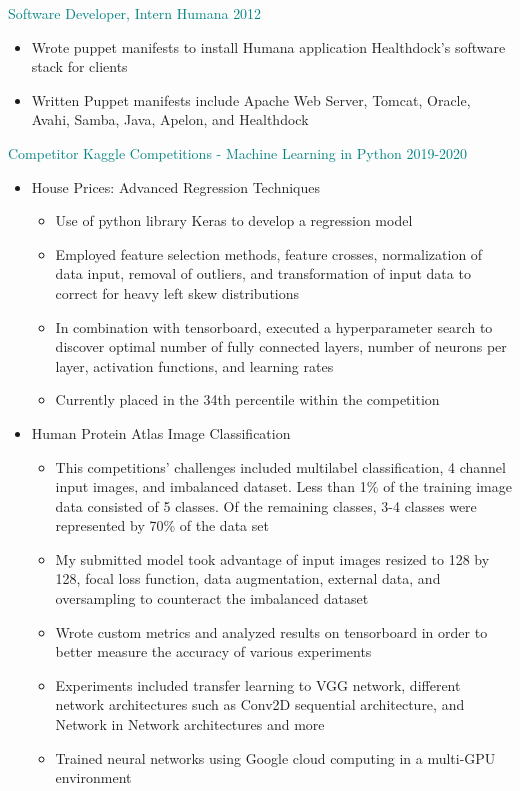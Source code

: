 \documentclass[11pt]{ltxdoc}
\begin{document}
	\textcolor{teal}{Software Developer, Intern} \hfill \textcolor{teal}{Humana} \hfill \textcolor{teal}{2012}
		
		\begin{itemize}
			\item Wrote puppet manifests to install Humana application Healthdock's software stack for clients
			\item Written Puppet manifests include Apache Web Server, Tomcat, Oracle, Avahi, Samba, Java, Apelon, and Healthdock
		\end{itemize}
		
		{\textcolor{teal}{Competitor} \hfill \textcolor{teal}{Kaggle Competitions - Machine Learning in Python} \hfill \textcolor{teal}{2019-2020}}
		\begin{itemize}
        	  \item House Prices: Advanced Regression Techniques
        	    \begin{itemize}
        	      \item Use of python library Keras to develop a regression model
        	      \item Employed feature selection methods, feature crosses, normalization of data input, removal of outliers, and transformation of input data to correct for heavy left skew distributions
        	      \item In combination with tensorboard, executed a hyperparameter search to discover optimal number of fully connected layers, number of neurons per layer, activation functions, and learning rates
        	      \item Currently placed in the 34th percentile within the competition
        	    \end{itemize}
        	  \item Human Protein Atlas Image Classification
        	    \begin{itemize}
        	      \item This competitions' challenges included multilabel classification, 4 channel input images, and imbalanced dataset. Less than 1\% of the training image data consisted of 5 classes. Of the remaining classes, 3-4 classes were represented by 70\% of the data set
        	      \item My submitted model took advantage of input images resized to 128 by 128, focal loss function, data augmentation, external data, and oversampling to counteract the imbalanced dataset
        	      \item Wrote custom metrics and analyzed results on tensorboard in order to better measure the accuracy of various experiments
        	      \item Experiments included transfer learning to VGG network, different network architectures such as Conv2D sequential architecture, and Network in Network architectures and more
        	      \item Trained neural networks using Google cloud computing in a multi-GPU environment
        	    \end{itemize}
        	\end{itemize}
\end{document}
